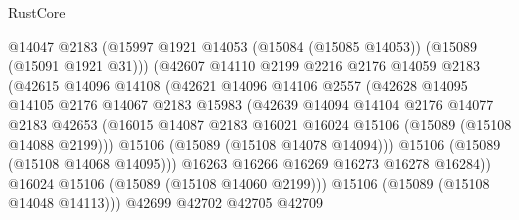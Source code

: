 \begin{lexlean}{RustCore}
\begin{coremodule}
                            @14047
                            @2183
                            (@15997
                              @1921
                              @14053
                              (@15084 (@15085 @14053))
                              (@15089 (@15091 @1921 @31)))
                            (@42607
                              @14110
                              @2199
                              @2216
                              @2176
                              @14059
                              @2183
                              (@42615
                                @14096
                                @14108
                                (@42621
                                  @14096
                                  @14106
                                  @2557
                                  (@42628
                                    @14095
                                    @14105
                                    @2176
                                    @14067
                                    @2183
                                    @15983
                                    (@42639
                                      @14094
                                      @14104
                                      @2176
                                      @14077
                                      @2183
                                      @42653
                                      (@16015
                                        @14087
                                        @2183
                                        @16021
                                        @16024
                                        @15106
                                        (@15089 (@15108 @14088 @2199)))
                                      @15106
                                      (@15089 (@15108 @14078 @14094)))
                                    @15106
                                    (@15089 (@15108 @14068 @14095)))
                                  @16263
                                  @16266
                                  @16269
                                  @16273
                                  @16278
                                  @16284))
                              @16024
                              @15106
                              (@15089 (@15108 @14060 @2199)))
                            @15106
                            (@15089 (@15108 @14048 @14113)))
                          @42699
                          @42702
                          @42705
                          @42709

\end{coremodule}
\end{lexlean}
